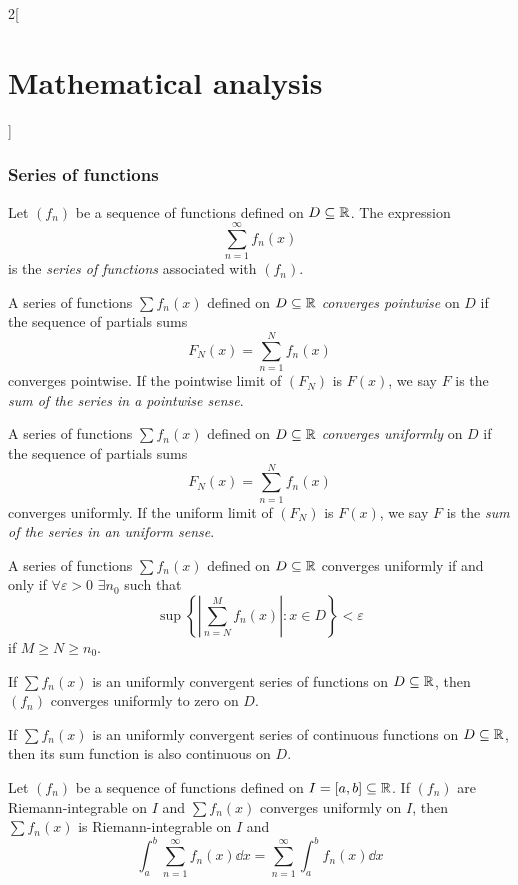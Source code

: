 \documentclass[../../../main_math.tex]{subfiles}
\begin{document}
\begin{multicols}{2}[\section{Mathematical analysis}]
  \subsubsection{Series of functions}
  \begin{definition}
    Let $(f_n)$ be a sequence of functions defined on $D\subseteq\mathbb{R} $. The expression $$\sum_{n=1}^\infty f_n(x)$$ is the \emph{series of functions} associated with $(f_n)$.
  \end{definition}
  \begin{definition}
    A series of functions $\sum f_n(x)$ defined on $D\subseteq\mathbb{R} $ \emph{converges pointwise} on $D$ if the sequence of partials sums $$F_N(x)=\sum_{n=1}^Nf_n(x)$$ converges pointwise. If the pointwise limit of $(F_N)$ is $F(x)$, we say $F$ is the \emph{sum of the series in a pointwise sense}.
  \end{definition}
  \begin{definition}
    A series of functions $\sum f_n(x)$ defined on $D\subseteq\mathbb{R} $ \emph{converges uniformly} on $D$ if the sequence of partials sums $$F_N(x)=\sum_{n=1}^Nf_n(x)$$ converges uniformly. If the uniform limit of $(F_N)$ is $F(x)$, we say $F$ is the \emph{sum of the series in an uniform sense}.
  \end{definition}
  \begin{theorem}
    A series of functions $\sum f_n(x)$ defined on $D\subseteq\mathbb{R} $ converges uniformly if and only if $\forall\varepsilon>0$ $\exists n_0$ such that $$\sup\left\{\left|\sum_{n=N}^Mf_n(x)\right|:x\in D\right\}< \varepsilon$$ if $M\geq N\geq n_0$.
  \end{theorem}
  \begin{corollary}
    If $\sum f_n(x)$ is an uniformly convergent series of functions on $D\subseteq\mathbb{R} $, then $(f_n)$ converges uniformly to zero on $D$.
  \end{corollary}
  \begin{theorem}\label{MA:seriessumcontinuous}
    If $\sum f_n(x)$ is an uniformly convergent series of continuous functions on $D\subseteq\mathbb{R} $, then its sum function is also continuous on $D$.
  \end{theorem}
  \begin{theorem}\label{MA:seriesuniformintegral}
    Let $(f_n)$ be a sequence of functions defined on $I=[a,b]\subseteq\mathbb{R} $. If $(f_n)$ are Riemann-integrable on $I$ and $\sum f_n(x)$ converges uniformly on $I$, then $\sum f_n(x)$ is Riemann-integrable on $I$ and $$\int_a^b\sum_{n=1}^\infty f_n(x) \dd{x}=\sum_{n=1}^\infty \int_a^bf_n(x) \dd{x}$$

\end{theorem}
\end{multicols}
\end{document}
